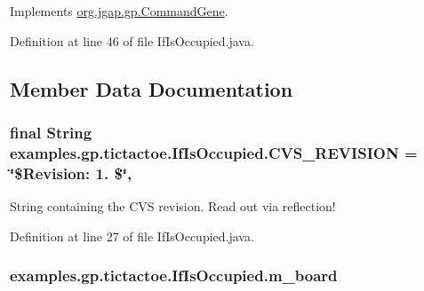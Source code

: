 Implements \hyperlink{classorg_1_1jgap_1_1gp_1_1_command_gene_a236141d99059da808afe7a9217e411c7}{org.\-jgap.\-gp.\-Command\-Gene}.



Definition at line 46 of file If\-Is\-Occupied.\-java.



\subsection{Member Data Documentation}
\hypertarget{classexamples_1_1gp_1_1tictactoe_1_1_if_is_occupied_a4d48c54d90dc06a2a8af0cb408bfca97}{
\subsubsection[{C\-V\-S\-\_\-\-R\-E\-V\-I\-S\-I\-O\-N}]{\setlength{\rightskip}{0pt plus 5cm}final String examples.\-gp.\-tictactoe.\-If\-Is\-Occupied.\-C\-V\-S\-\_\-\-R\-E\-V\-I\-S\-I\-O\-N = \char`\"{}\$Revision\-: 1. \$\char`\"{}\hspace{0.3cm}{\ttfamily [static]}, {\ttfamily [private]}}}\label{classexamples_1_1gp_1_1tictactoe_1_1_if_is_occupied_a4d48c54d90dc06a2a8af0cb408bfca97}
String containing the C\-V\-S revision. Read out via reflection! 

Definition at line 27 of file If\-Is\-Occupied.\-java.

\hypertarget{classexamples_1_1gp_1_1tictactoe_1_1_if_is_occupied_ae737c8e46c9e502066d66a55d4482d1b}{
\subsubsection[{m\-\_\-board}]{ examples.\-gp.\-tictactoe.\-If\-Is\-Occupied.\-m\-\_\-board\hspace{0.3cm}{\ttfamily [private]}}}\label{classexamples_1_1gp_1_1tictactoe_1_1_if_is_occupied_ae737c8e46c9e502066d66a55d4482d1b}


